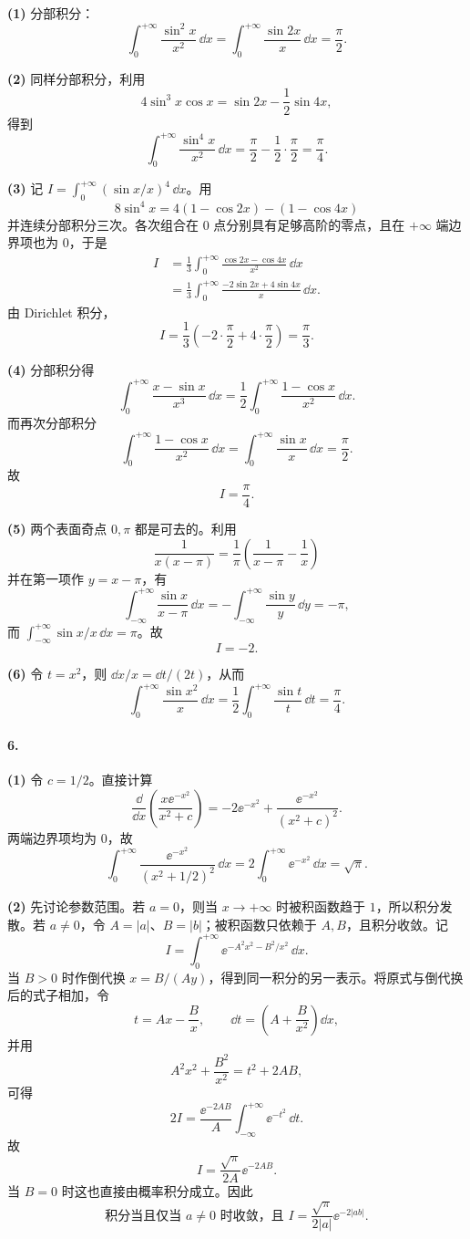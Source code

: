 \textbf{(1)} 分部积分：
\[
  \int_0^{+\infty}\frac{\sin^2x}{x^2}\,\dd x
  =\int_0^{+\infty}\frac{\sin2x}{x}\,\dd x
  =\boxed{\frac\pi2}.
\]

\textbf{(2)} 同样分部积分，利用
\[
  4\sin^3x\cos x=\sin2x-\frac12\sin4x,
\]
得到
\[
  \boxed{\int_0^{+\infty}\frac{\sin^4x}{x^2}\,\dd x
  =\frac\pi2-\frac12\cdot\frac\pi2=\frac\pi4}.
\]

\textbf{(3)} 记 $I=\int_0^{+\infty}(\sin x/x)^4\,\dd x$。用
\[
  8\sin^4x=4(1-\cos2x)-(1-\cos4x)
\]
并连续分部积分三次。各次组合在 $0$ 点分别具有足够高阶的零点，且在 $+\infty$ 端边界项也为 $0$，于是
\begin{align*}
  I
  &=\frac13\int_0^{+\infty}\frac{\cos2x-\cos4x}{x^2}\,\dd x\\
  &=\frac13\int_0^{+\infty}\frac{-2\sin2x+4\sin4x}{x}\,\dd x.
\end{align*}
由 Dirichlet 积分，
\[
  I=\frac13\left(-2\cdot\frac\pi2+4\cdot\frac\pi2\right)
  =\boxed{\frac\pi3}.
\]

\textbf{(4)} 分部积分得
\[
  \int_0^{+\infty}\frac{x-\sin x}{x^3}\,\dd x
  =\frac12\int_0^{+\infty}\frac{1-\cos x}{x^2}\,\dd x.
\]
而再次分部积分
\[
  \int_0^{+\infty}\frac{1-\cos x}{x^2}\,\dd x
  =\int_0^{+\infty}\frac{\sin x}{x}\,\dd x=\frac\pi2.
\]
故
\[
  \boxed{I=\frac\pi4}.
\]

\textbf{(5)} 两个表面奇点 $0,\pi$ 都是可去的。利用
\[
  \frac1{x(x-\pi)}=\frac1\pi\left(\frac1{x-\pi}-\frac1x\right)
\]
并在第一项作 $y=x-\pi$，有
\[
  \int_{-\infty}^{+\infty}\frac{\sin x}{x-\pi}\,\dd x
  =-\int_{-\infty}^{+\infty}\frac{\sin y}{y}\,\dd y=-\pi,
\]
而 $\int_{-\infty}^{+\infty}\sin x/x\,\dd x=\pi$。故
\[
  \boxed{I=-2}.
\]

\textbf{(6)} 令 $t=x^2$，则 $\dd x/x=\dd t/(2t)$，从而
\[
  \boxed{\int_0^{+\infty}\frac{\sin x^2}{x}\,\dd x
  =\frac12\int_0^{+\infty}\frac{\sin t}{t}\,\dd t=\frac\pi4}.
\]

\paragraph{6.}
\textbf{(1)} 令 $c=1/2$。直接计算
\[
  \frac{\dd}{\dd x}\left(\frac{x\ee^{-x^2}}{x^2+c}\right)
  =-2\ee^{-x^2}+\frac{\ee^{-x^2}}{(x^2+c)^2}.
\]
两端边界项均为 $0$，故
\[
  \boxed{\int_0^{+\infty}\frac{\ee^{-x^2}}{(x^2+1/2)^2}\,\dd x
  =2\int_0^{+\infty}\ee^{-x^2}\,\dd x=\sqrt\pi}.
\]

\textbf{(2)} 先讨论参数范围。若 $a=0$，则当 $x\to+\infty$ 时被积函数趋于 $1$，所以积分发散。若 $a\neq0$，令 $A=|a|$、$B=|b|$；被积函数只依赖于 $A,B$，且积分收敛。记
\[
  I=\int_0^{+\infty}\ee^{-A^2x^2-B^2/x^2}\,\dd x.
\]
当 $B>0$ 时作倒代换 $x=B/(Ay)$，得到同一积分的另一表示。将原式与倒代换后的式子相加，令
\[
  t=Ax-\frac Bx,
  \qquad \dd t=\left(A+\frac B{x^2}\right)\dd x,
\]
并用
\[
  A^2x^2+\frac{B^2}{x^2}=t^2+2AB,
\]
可得
\[
  2I=\frac{\ee^{-2AB}}A\int_{-\infty}^{+\infty}\ee^{-t^2}\,\dd t.
\]
故
\[
  I=\frac{\sqrt\pi}{2A}\ee^{-2AB}.
\]
当 $B=0$ 时这也直接由概率积分成立。因此
\[
  \boxed{\text{积分当且仅当 }a\neq0\text{ 时收敛，且 }
  I=\frac{\sqrt\pi}{2|a|}\ee^{-2|ab|}.}
\]


